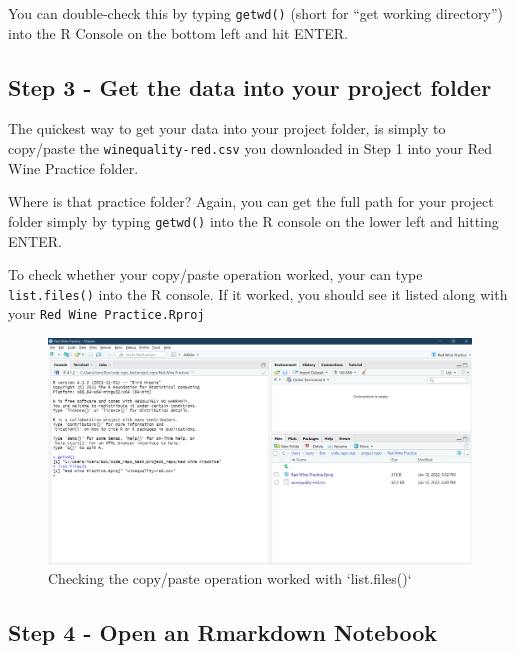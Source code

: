 \documentclass[
]{book}
\begin{document}
You can double-check this by typing \texttt{getwd()} (short for ``get working directory'') into the R Console on the bottom left and hit ENTER.

\hypertarget{step-3---get-the-data-into-your-project-folder}{%
\subsection{Step 3 - Get the data into your project folder}\label{step-3---get-the-data-into-your-project-folder}}

The quickest way to get your data into your project folder, is simply to copy/paste the \texttt{winequality-red.csv} you downloaded in Step 1 into your Red Wine Practice folder.

Where is that practice folder? Again, you can get the full path for your project folder simply by typing \texttt{getwd()} into the R console on the lower left and hitting ENTER.

To check whether your copy/paste operation worked, your can type \texttt{list.files()} into the R console. If it worked, you should see it listed along with your \texttt{Red\ Wine\ Practice.Rproj}

\begin{figure}

{\centering \includegraphics[width=1\linewidth]{images/rproj_data_import} 

}

\caption{Checking the copy/paste operation worked with `list.files()`}\label{fig:unnamed-chunk-6}
\end{figure}

\hypertarget{step-4---open-an-rmarkdown-notebook}{%
\subsection{Step 4 - Open an Rmarkdown Notebook}\label{step-4---open-an-rmarkdown-notebook}}
\end{document}
